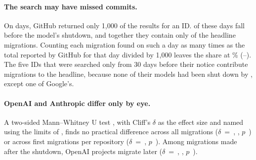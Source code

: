\paragraph{The search may have missed commits.} On \CutDays{} days, GitHub returned only 1,000 of the results for an ID. \CutDaysBefore{} of these days fall before the model's shutdown, and together they contain only \CutRowsReweighted{} of the headline migrations. Counting each migration found on such a day as many times as the total reported by GitHub for that day divided by 1,000 leaves the share at \AfterReweighted\% (\AfterReweightedLow--\AfterReweightedHigh). The five IDs that were searched only from 30 days before their notice contribute \LateSearchedRows{} migrations to the headline, because none of their models had been shut down by \RetiredBy, except one of Google's.

\paragraph{OpenAI and Anthropic differ only by eye.} A two-sided Mann--Whitney U test \citep{mann1947}, with Cliff's $\delta$ \citep{cliff1993} as the effect size and named using the limits of \citet{romano2006}, finds no practical difference across all migrations ($\delta$~=~\CliffAll, \CliffAllSize, $p$~\CliffAllP) or across first migrations per repository ($\delta$~=~\CliffFirst, $p$~\CliffFirstP). Among migrations made after the shutdown, OpenAI projects migrate later ($\delta$~=~\CliffLate, \CliffLateSize, $p$~\CliffLateP).

